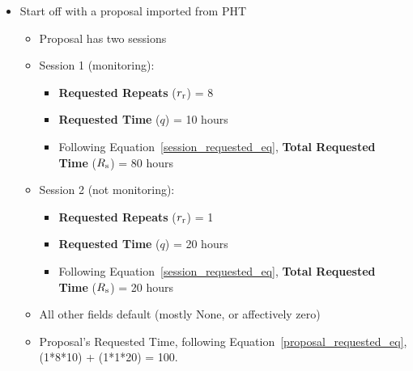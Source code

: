 \documentclass{article}
\begin{document}
\begin{itemize}
\item Start off with a proposal imported from PHT
    \begin{itemize}
    \item Proposal has two sessions
    \item Session 1 (monitoring): 
        \begin{itemize}
        \item {\bf Requested Repeats} ($r_{\rm r}$) = 8
        \item {\bf Requested Time} ($q$) = 10 hours
        \item Following Equation~\ref{session_requested_eq}, {\bf Total Requested Time} ($R_{\rm s}$) = 80 hours
        \end{itemize}
     \item Session 2 (not monitoring): 
         \begin{itemize}
         \item {\bf Requested Repeats} ($r_{\rm r}$) = 1
         \item {\bf Requested Time} ($q$) = 20 hours
         \item Following Equation~\ref{session_requested_eq}, {\bf Total Requested Time} ($R_{\rm s}$) = 20 hours
         \end{itemize}
     \item All other fields default (mostly None, or affectively zero)
     \item Proposal's Requested Time, following Equation~\ref{proposal_requested_eq}, (1*8*10) + (1*1*20) = 100.
         

\end{itemize}
\end{itemize}
\end{document}
